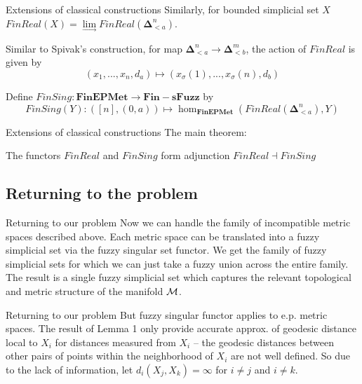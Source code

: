 \documentclass{beamer}
\theoremstyle{named}
\begin{document}
\begin{frame}{Extensions of classical constructions}
	Similarly, for bounded simplicial set $X$ $FinReal(X) = \lim\limits_{\to} FinReal(\mathbf{\Delta}^n_{<a})$.
	
	Similar to Spivak's construction, for map $\mathbf{\Delta}^n_{<a} \to \mathbf{\Delta}^m_{<b} $, the action of $FinReal$ is given by 
	\[
		({x_1, ..., x_n}, d_a) \mapsto ({x_\sigma(1), ..., x_\sigma(n)}, d_b)
	\]
	\begin{definition}
		Define $FinSing : \pmb{FinEPMet} \to  \pmb{Fin-sFuzz} $ by
		\[
			FinSing(Y) : ([n], (0,a)) \mapsto \hom_{\pmb{FinEPMet}} (FinReal(\mathbf{\Delta}^n_{<a}), Y)
		\]
	\end{definition}
\end{frame}


\begin{frame}{Extensions of classical constructions}
	The main theorem:
	\begin{theorem}
		The functors $FinReal$ and $FinSing$ form adjunction $FinReal \dashv FinSing$
	\end{theorem}
\end{frame}

\subsection{Returning to the problem}

\begin{frame}{Returning to our problem}
	Now we can handle the family of incompatible metric spaces described above. Each metric space can be translated into a fuzzy simplicial set via the fuzzy singular set functor. We get the family of fuzzy simplicial sets for which we can just take a fuzzy union across the entire family. The result is a single fuzzy simplicial set which captures the relevant topological and metric structure of the manifold $\cal{M}$.
\end{frame}

\begin{frame}{Returning to our problem}
	But fuzzy singular functor applies to e.p. metric spaces. The result of Lemma 1 only provide accurate approx. of geodesic distance local to $X_i$ for distances measured from $X_i$ –
	the geodesic distances between other pairs of points within the neighborhood of $X_i$ are not well defined. So due to the lack of information, let $d_i(X_j, X_k) = \infty$ for $i \neq j$ and $i \neq k$.
\end{frame}
\end{document}
